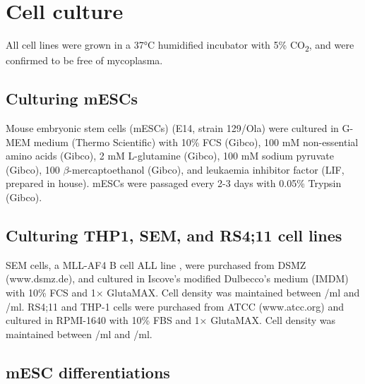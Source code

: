 \section{Cell culture}

All cell lines were grown in a 37°C humidified incubator with 5\% CO\textsubscript{2}, and were confirmed to be free of mycoplasma.

\subsection{Culturing mESCs}

Mouse embryonic stem cells (mESCs) (E14, strain 129/Ola) were cultured in G-MEM medium (Thermo Scientific) with 10\% FCS (Gibco), 100 mM non-essential amino acids (Gibco), 2 mM L-glutamine (Gibco), 100 mM sodium pyruvate (Gibco), 100 \microm{} $\beta$-mercaptoethanol (Gibco), and leukaemia inhibitor factor (LIF, prepared in house). mESCs were passaged every 2-3 days with 0.05\% Trypsin (Gibco). 

\subsection{Culturing THP1, SEM, and RS4;11 cell lines}

SEM cells, a MLL-AF4 B cell ALL line \citep{greil_acute_1994}, were purchased from DSMZ (www.dsmz.de), and cultured in Iscove’s modified Dulbecco’s medium (IMDM) with 10\% FCS and 1× GlutaMAX. Cell density was maintained between /ml and /ml. RS4;11 and THP-1 cells were purchased from ATCC (www.atcc.org) and cultured in RPMI-1640 with 10\% FBS and 1× GlutaMAX. Cell density was maintained between /ml and /ml. 

\subsection{mESC differentiations}

